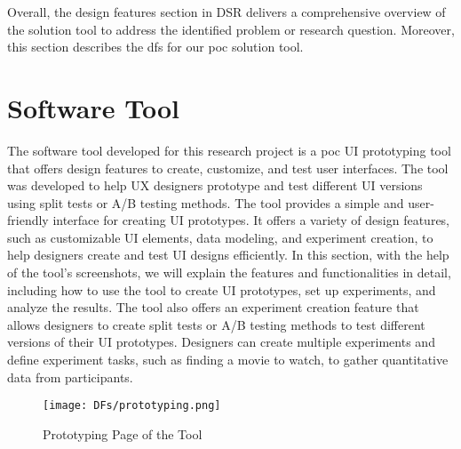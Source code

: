 Overall, the design features section in DSR delivers a comprehensive overview of the solution tool to address the identified problem or research question. 
Moreover, this section describes the \ac{df}s for our \ac{poc} solution tool.
\clearpage

\section{Software Tool}
\label{implementation:section:tool}
The software tool developed for this research project is a \ac{poc} UI prototyping tool that offers design features to create, customize, and test user interfaces. 
The tool was developed to help UX designers prototype and test different UI versions using split tests or A/B testing methods. 
The tool provides a simple and user-friendly interface for creating UI prototypes. 
It offers a variety of design features, such as customizable UI elements, data modeling, and experiment creation, to help designers create and test UI designs efficiently. 
In this section, with the help of the tool's screenshots, we will explain the features and functionalities in detail, including how to use the tool to create UI prototypes, set up experiments, and analyze the results.
The tool also offers an experiment creation feature that allows designers to create split tests or A/B testing methods to test different versions of their UI prototypes. 
Designers can create multiple experiments and define experiment tasks, such as finding a movie to watch, to gather quantitative data from participants.

\begin{figure}[ht]
    \centering
    \texttt{[image: DFs/prototyping.png]}
    \caption{Prototyping Page of the Tool}
    \label{implementation:fig:prototypingSol}
\end{figure}

